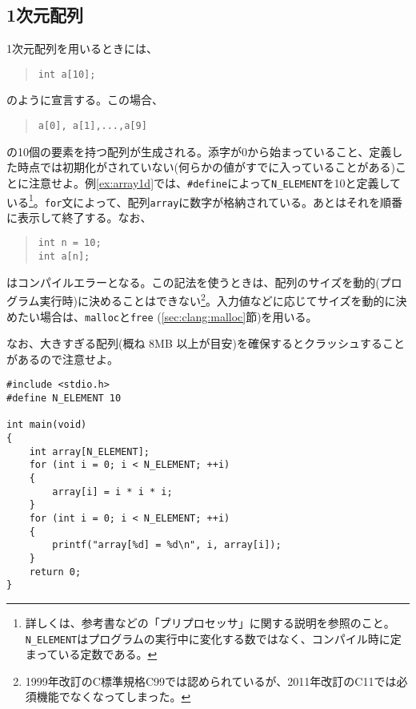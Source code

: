 \subsection{1次元配列}
1次元配列を用いるときには、
\begin{quote}
    \begin{verbatim}
int a[10];
\end{verbatim}
\end{quote}
のように宣言する。この場合、
\begin{quote}
    \begin{verbatim}
a[0], a[1],...,a[9]
\end{verbatim}
\end{quote}
の10個の要素を持つ配列が生成される。添字が0から始まっていること、定義した時点では初期化がされていない(何らかの値がすでに入っていることがある)ことに注意せよ。例\ref{ex:array1d}では、\texttt{\#define}によって\texttt{N\_ELEMENT}を10と定義している\footnote{詳しくは、参考書などの「プリプロセッサ」に関する説明を参照のこと。\texttt{N\_ELEMENT}はプログラムの実行中に変化する数ではなく、コンパイル時に定まっている定数である。}。\texttt{for}文によって、配列\texttt{array}に数字が格納されている。あとはそれを順番に表示して終了する。なお、
\begin{quote}
    \begin{verbatim}
int n = 10;
int a[n];
\end{verbatim}
\end{quote}
はコンパイルエラーとなる。この記法を使うときは、配列のサイズを動的(プログラム実行時)に決めることはできない\footnote{1999年改訂のC標準規格C99では認められているが、2011年改訂のC11では必須機能でなくなってしまった。}。入力値などに応じてサイズを動的に決めたい場合は、\texttt{malloc}と\texttt{free} (\ref{sec:clang:malloc}節)を用いる。

なお、大きすぎる配列(概ね 8MB 以上が目安)を確保するとクラッシュすることがあるので注意せよ。
\begin{reidai}\label{ex:array1d}
    \begin{verbatim}
#include <stdio.h>
#define N_ELEMENT 10

int main(void)
{
    int array[N_ELEMENT];
    for (int i = 0; i < N_ELEMENT; ++i)
    {
        array[i] = i * i * i;
    }
    for (int i = 0; i < N_ELEMENT; ++i)
    {
        printf("array[%d] = %d\n", i, array[i]);
    }
    return 0;
}
\end{verbatim}
\end{reidai}

